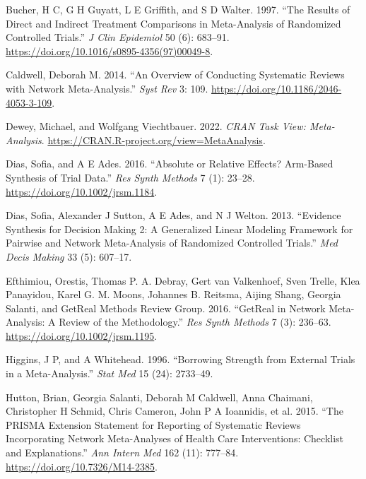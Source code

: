 \hypertarget{refs}{}
\begin{CSLReferences}{1}{0}
\leavevmode{}%
Bucher, H C, G H Guyatt, L E Griffith, and S D Walter. 1997. {``The Results of Direct and Indirect Treatment Comparisons in Meta-Analysis of Randomized Controlled Trials.''} \emph{J Clin Epidemiol} 50 (6): 683--91. \url{https://doi.org/10.1016/s0895-4356(97)00049-8}.

\leavevmode{}%
Caldwell, Deborah M. 2014. {``An Overview of Conducting Systematic Reviews with Network Meta-Analysis.''} \emph{Syst Rev} 3: 109. \url{https://doi.org/10.1186/2046-4053-3-109}.

\leavevmode{}%
Dewey, Michael, and Wolfgang Viechtbauer. 2022. \emph{{CRAN Task View}: Meta-Analysis}. \url{https://CRAN.R-project.org/view=MetaAnalysis}.

\leavevmode{}%
Dias, Sofia, and A E Ades. 2016. {``Absolute or Relative Effects? Arm-Based Synthesis of Trial Data.''} \emph{Res Synth Methods} 7 (1): 23--28. \url{https://doi.org/10.1002/jrsm.1184}.

\leavevmode{}%
Dias, Sofia, Alexander J Sutton, A E Ades, and N J Welton. 2013. {``Evidence Synthesis for Decision Making 2: A Generalized Linear Modeling Framework for Pairwise and Network Meta-Analysis of Randomized Controlled Trials.''} \emph{Med Decis Making} 33 (5): 607--17.

\leavevmode{}%
Efthimiou, Orestis, Thomas P. A. Debray, Gert van Valkenhoef, Sven Trelle, Klea Panayidou, Karel G. M. Moons, Johannes B. Reitsma, Aijing Shang, Georgia Salanti, and GetReal Methods Review Group. 2016. {``GetReal in Network Meta-Analysis: A Review of the Methodology.''} \emph{Res Synth Methods} 7 (3): 236--63. \url{https://doi.org/10.1002/jrsm.1195}.

\leavevmode{}%
Higgins, J P, and A Whitehead. 1996. {``Borrowing Strength from External Trials in a Meta-Analysis.''} \emph{Stat Med} 15 (24): 2733--49.

\leavevmode{}%
Hutton, Brian, Georgia Salanti, Deborah M Caldwell, Anna Chaimani, Christopher H Schmid, Chris Cameron, John P A Ioannidis, et al. 2015. {``The PRISMA Extension Statement for Reporting of Systematic Reviews Incorporating Network Meta-Analyses of Health Care Interventions: Checklist and Explanations.''} \emph{Ann Intern Med} 162 (11): 777--84. \url{https://doi.org/10.7326/M14-2385}.


\end{CSLReferences}
